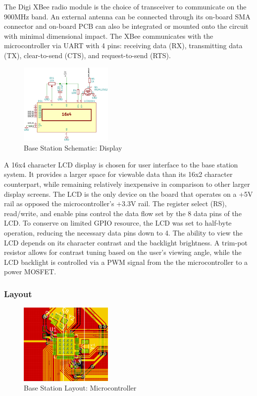 \documentclass[journal,compsoc]{IEEEtran}
\begin{document}
The Digi XBee radio module is the choice of transceiver to communicate on the 900MHz band. An external antenna can be connected through its on-board SMA connector and on-board PCB can also be integrated or mounted onto the circuit with minimal dimensional impact. The XBee communicates with the microcontroller via UART with 4 pins: receiving data (RX), transmitting data (TX), clear-to-send (CTS), and request-to-send (RTS).

\begin{figure}[ht] 	%
\centering
\includegraphics[width=0.4\textwidth]{base-schematic-lcd.png}
\caption{ \space Base Station Schematic: Display}
\label{base-sch-lcd}
\end{figure}

A 16x4 character LCD display is chosen for user interface to the base station system. It provides a larger space for viewable data than its 16x2 character counterpart, while remaining relatively inexpensive in comparison to other larger display screens. The LCD is the only device on the board that operates on a +5V rail as opposed the microcontroller's +3.3V rail. The register select (RS), read/write, and enable pins control the data flow set by the 8 data pins of the LCD. To conserve on limited GPIO resource, the LCD was set to half-byte operation, reducing the necessary data pins down to 4. The ability to view the LCD depends on its character contrast and the backlight brightness. A trim-pot resistor allows for contrast tuning based on the user's viewing angle, while the LCD backlight is controlled via a PWM signal from the the microcontroller to a power MOSFET.

\subsubsection{Layout}

\begin{figure}[ht] 	%
\centering
\includegraphics[width=0.4\textwidth]{base-layout-uc.PNG}
\caption{ \space Base Station Layout: Microcontroller}
\label{base-lay-uc}
\end{figure}
\end{document}
